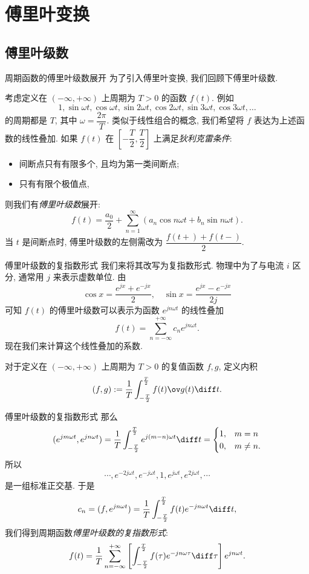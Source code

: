 \section{傅里叶变换}

\subsection{傅里叶级数}

\begin{frame}{周期函数的傅里叶级数展开}
	\onslide<+->
	为了引入傅里叶变换, 我们回顾下傅里叶级数.

	\onslide<+->
	考虑定义在 $(-\infty,+\infty)$ 上周期为 $T>0$ 的函数 $f(t)$.
	\onslide<+->
	例如
	\[
		1,\sin{\omega t},\cos{\omega t},
		\sin{2\omega t},\cos{2\omega t},
		\sin{3\omega t},\cos{3\omega t},\dots
	\]
	的周期都是 $T$, 其中 $\omega=\dfrac{2\pi}T$.
	\onslide<+->
	类似于线性组合的概念, 我们希望将 $f$ 表达为上述函数的线性叠加.
	\onslide<+->
	如果 $f(t)$ 在 $\left[-\dfrac T2,\dfrac T2\right]$ 上满足\emph{狄利克雷条件}:
	\begin{itemize}
		\item 间断点只有有限多个, 且均为第一类间断点;
		\item 只有有限个极值点,
	\end{itemize}
	\onslide<+->
	则我们有\emph{傅里叶级数}展开:
	\[f(t)=\frac{a_0}2+\sum_{n=1}^\infty \left(a_n\cos n\omega t+b_n \sin n\omega t\right).\]
	\onslide<+->
	当 $t$ 是间断点时, 傅里叶级数的左侧需改为 $\dfrac{f(t+)+f(t-)}2$.
\end{frame}


\begin{frame}{傅里叶级数的复指数形式}
	\onslide<+->
	我们来将其改写为复指数形式.
	\onslide<+->
	物理中为了与电流 $i$ 区分, 通常用 $j$ 来表示虚数单位.
	\onslide<+->
	由
	\[\cos x=\frac{e^{jx}+e^{-jx}}2,\quad \sin x=\frac{e^{jx}-e^{-jx}}{2j}\]
	\onslide<+->
	可知 $f(t)$ 的傅里叶级数可以表示为函数 $e^{jn\omega t}$ 的线性叠加
	\[
		f(t)=\sum_{n=-\infty}^{+\infty}c_ne^{jn\omega t}.
	\]
	\onslide<+->
	现在我们来计算这个线性叠加的系数.

	\onslide<+->
	对于定义在 $(-\infty,+\infty)$ 上周期为 $T>0$ 的\alert{复值}函数 $f,g$, 定义内积
	\[(f,g):=\frac1T\int_{-\frac T2}^{\frac T2} f(t)\ov g(t)\diff t.\]
\end{frame}


\begin{frame}{傅里叶级数的复指数形式}
	\onslide<+->
	那么
	\[(e^{jm\omega t},e^{jn\omega t})
	=\frac1T\int_{-\frac T2}^{\frac T2} e^{j(m-n)\omega t}\diff t=\begin{cases}
		1,&m=n\\
		0,&m\neq n.
	\end{cases}\]
	\onslide<+->
	所以
	\[\cdots,e^{-2j\omega t},e^{-j\omega t},1,e^{j\omega t},e^{2j\omega t},\cdots\]
	是一组标准正交基.
	\onslide<+->
	于是
	\[
		c_n=(f,e^{jn\omega t})=\frac 1T\int_{-\frac T2}^{\frac T2}f(t)e^{-jn\omega t} \diff t,
	\]
	\onslide<+->
	我们得到周期函数\emph{傅里叶级数的复指数形式}:
	\[
		f(t)=\frac 1T\sum_{n=-\infty}^{+\infty}\left[\int_{-\frac T2}^{\frac T2}f(\tau)e^{-jn\omega\tau} \diff\tau\right] e^{jn\omega t}.
	\]
\end{frame}


